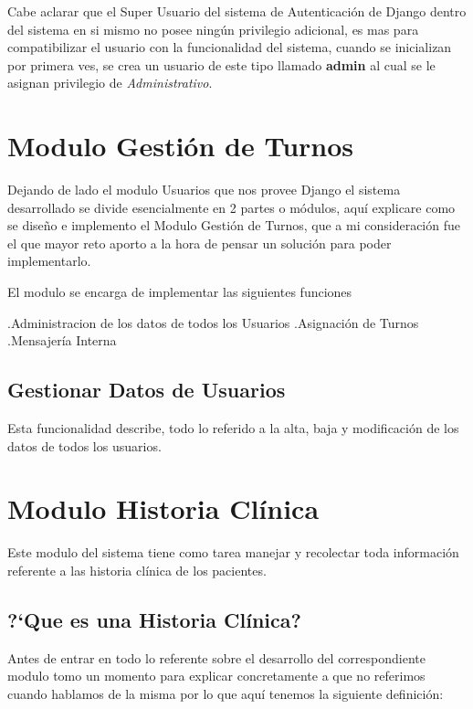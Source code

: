 Cabe aclarar que el Super Usuario del sistema de Autenticación de Django dentro 
del sistema en si mismo no posee ningún privilegio adicional, es mas para 
compatibilizar el usuario con la funcionalidad del sistema, cuando se inicializan
por primera ves, se crea un usuario de este tipo llamado \textbf{admin} al cual
se le asignan privilegio de \textit{Administrativo}.



\section{Modulo Gestión de Turnos}

Dejando de lado el modulo Usuarios que nos provee Django el sistema desarrollado 
se divide esencialmente en 2 partes o módulos, aquí explicare como se dise\~no e
implemento el Modulo Gestión de Turnos, que a mi consideración fue el que mayor
reto aporto a la hora de pensar un solución para poder implementarlo.

El modulo se encarga de implementar las siguientes funciones

.Administracion de los datos de todos los Usuarios
.Asignación de Turnos
.Mensajería Interna

\subsection {Gestionar Datos de Usuarios}

Esta funcionalidad describe, todo lo referido a la alta, baja y modificación de 
los datos de todos los usuarios.


\section{Modulo Historia Clínica}

Este modulo del sistema tiene como tarea manejar y recolectar toda información 
referente a las historia clínica de los pacientes.

\subsection{?`Que es una Historia Clínica?}

Antes de entrar en todo lo referente sobre el desarrollo del correspondiente modulo
tomo un momento para explicar concretamente a que no referimos cuando hablamos de 
la misma por lo que aquí tenemos la siguiente definición:

